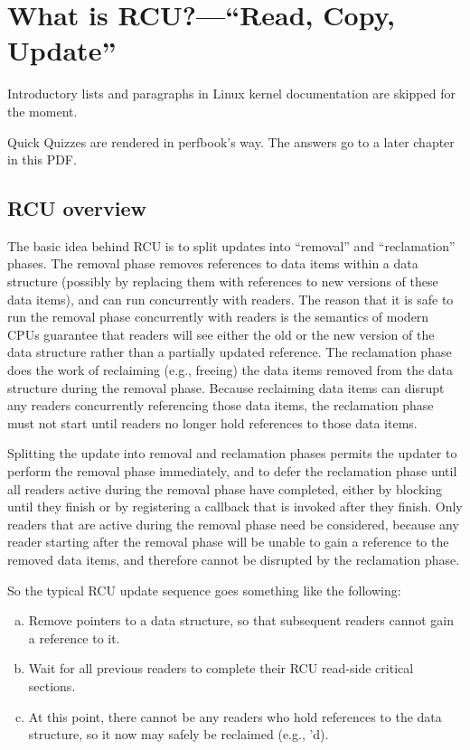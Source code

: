 \section{What is RCU?---``Read, Copy, Update''}
\label{sec:rcu:What is RCU?}

\begin{Note}
  Introductory lists and paragraphs in Linux kernel documentation are
  skipped for the moment.

  Quick Quizzes are rendered in perfbook's way.
  The answers go to a later chapter in this PDF\@.
\end{Note}

\subsection{RCU overview}
\label{sec:rcu:RCU overview}

The basic idea behind RCU is to split updates into ``removal'' and
``reclamation'' phases.
The removal phase removes references to data items
within a data structure (possibly by replacing them with references to
new versions of these data items), and can run concurrently with readers.
The reason that it is safe to run the removal phase concurrently with
readers is the semantics of modern CPUs guarantee that readers will see
either the old or the new version of the data structure rather than a
partially updated reference.
The reclamation phase does the work of reclaiming
(e.g., freeing) the data items removed from the data structure during the
removal phase.
Because reclaiming data items can disrupt any readers
concurrently referencing those data items, the reclamation phase must
not start until readers no longer hold references to those data items.

Splitting the update into removal and reclamation phases permits the
updater to perform the removal phase immediately, and to defer the
reclamation phase until all readers active during the removal phase have
completed, either by blocking until they finish or by registering a
callback that is invoked after they finish.
Only readers that are active
during the removal phase need be considered, because any reader starting
after the removal phase will be unable to gain a reference to the removed
data items, and therefore cannot be disrupted by the reclamation phase.

So the typical RCU update sequence goes something like the following:

\begin{enumerate}[(a)]
\item	Remove pointers to a data structure, so that subsequent
	readers cannot gain a reference to it.

\item	Wait for all previous readers to complete their RCU read-side
	critical sections.

\item	At this point, there cannot be any readers who hold references
	to the data structure, so it now may safely be reclaimed
	(e.g., 'd).
\end{enumerate}

